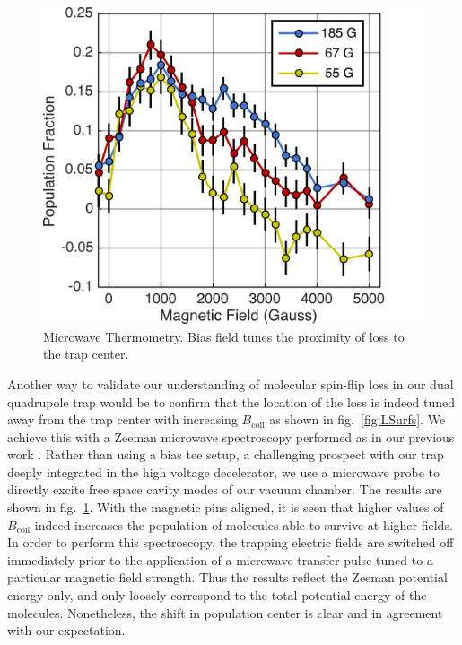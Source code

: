 \documentclass[%
 reprint,
groupedaddress,
 amsmath,amssymb,
 aps,
prl,
]{revtex4-1}
\begin{document}
\begin{figure}[tb]
\includegraphics[width=\linewidth]{MWSpec/MW-therm-dave.png}%
\caption{
Microwave Thermometry. Bias field tunes the proximity of loss to the trap center. 
\label{fig:spec}}
\end{figure}

Another way to validate our understanding of molecular spin-flip loss in our dual quadrupole trap would be to confirm that the location of the loss is indeed tuned away from the trap center with increasing $B_\text{coil}$ as shown in fig.~\ref{fig:LSurfs}. We achieve this with a Zeeman microwave spectroscopy performed as in our previous work \cite{Stuhl2012evap}. Rather than using a bias tee setup, a challenging prospect with our trap deeply integrated in the high voltage decelerator, we use a microwave probe to directly excite free space cavity modes of our vacuum chamber. The results are shown in fig.~\ref{fig:spec}. With the magnetic pins aligned, it is seen that higher values of $B_{\text{coil}}$ indeed increases the population of molecules able to survive at higher fields. In order to perform this spectroscopy, the trapping electric fields are switched off immediately prior to the application of a microwave transfer pulse tuned to a particular magnetic field strength. Thus the results reflect the Zeeman potential energy only, and only loosely correspond to the total potential energy of the molecules. Nonetheless, the shift in population center is clear and in agreement with our expectation.  %
\end{document}
